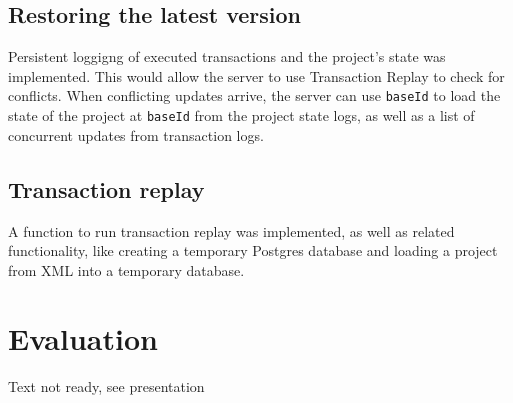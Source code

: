 \documentclass[a4paper, 11pt, oneside]{article}
\theoremstyle{definition}
\begin{document}
\subsection*{Restoring the latest version}

Persistent loggigng of executed transactions and the project's state was implemented. This would allow the server to use Transaction Replay to check for conflicts. When conflicting updates arrive, the server can use \verb|baseId| to load the state of the project at \verb|baseId| from the project state logs, as well as a list of concurrent updates from transaction logs.

\subsection*{Transaction replay}

A function to run transaction replay was implemented, as well as related functionality, like creating a temporary Postgres database and loading a project from XML into a temporary database. 

\section{Evaluation}

Text not ready, see presentation

\newpage
\clearpage
\newpage
\printbibliography
\clearpage
\end{document}
